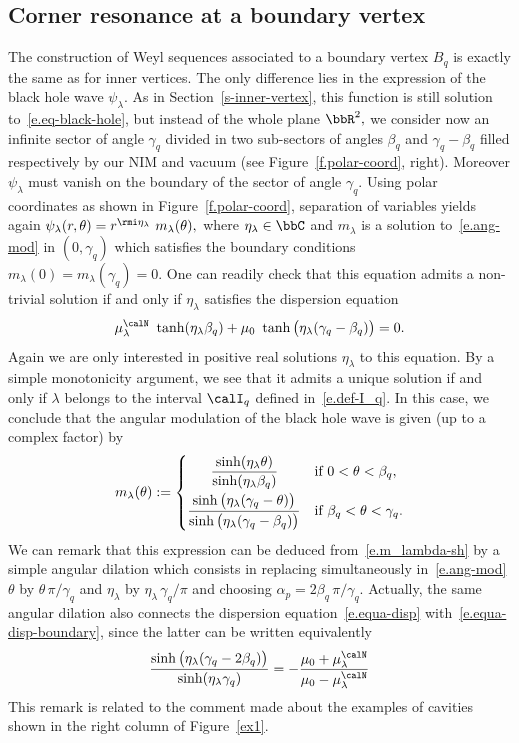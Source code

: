 \subsection{Corner resonance at a boundary vertex}\label{s-bound-vertex}
The construction of Weyl sequences associated to a boundary vertex $B_q$ is exactly the same as for inner vertices. The only difference lies in the expression of the black hole wave $\psi_\lambda.$ As in Section~\ref{s-inner-vertex}, this function is still solution to~\eqref{e.eq-black-hole}, but instead of the whole plane $\bbR^2,$ we consider now an infinite sector of angle $\gamma_q$ divided in two sub-sectors of angles $\beta_q$ and $\gamma_q - \beta_q$ filled respectively by our NIM and vacuum (see Figure~\ref{f.polar-coord}, right). Moreover $\psi_\lambda$ must vanish on the boundary of the sector of angle $\gamma_q.$ Using polar coordinates as shown in Figure~\ref{f.polar-coord}, separation of variables yields again $\psi_\lambda(r,\theta) = r^{\rmi\eta_\lambda}\ m_\lambda(\theta),$ where $\eta_\lambda \in \bbC$ and $m_\lambda$ is a solution to~\eqref{e.ang-mod} in $(0,\gamma_q)$ which satisfies the boundary conditions $m_\lambda(0) = m_\lambda(\gamma_q) = 0.$ One can readily check that this equation admits a non-trivial solution if and only if $\eta_\lambda$ satisfies the dispersion equation
\begin{equation}\label{e.equa-disp-boundary}
\mu_\lambda^\calN \ \tanh(\eta_\lambda\beta_q) + \mu_0\ \tanh\big(\eta_\lambda(\gamma_q-\beta_q)\big) = 0.
\end{equation}
Again we are only interested in positive real solutions $\eta_\lambda$ to this equation. By a simple monotonicity argument, we see that it admits a unique solution if and only if $\lambda$ belongs to the interval $\calI_q$ defined in~\eqref{e.def-I_q}. In this case, we conclude that the angular modulation of the black hole wave is given (up to a complex factor) by
\[
m_\lambda(\theta) := 
\begin{cases}
\displaystyle
\mkern 30 mu \frac{\sinh(\eta_\lambda \theta)}{\sinh(\eta_\lambda \beta_q)} & \text{if }\displaystyle 0 < \theta < \beta_q, \\[8pt]
\displaystyle
\frac{\sinh\big(\eta_\lambda (\gamma_q - \theta)\big)}{\sinh\big(\eta_\lambda (\gamma_q - \beta_q)\big)} & \text{if }\displaystyle \beta_q < \theta < \gamma_q.
\end{cases}
\]
We can remark that this expression can be deduced from~\eqref{e.m_lambda-sh} by a simple angular dilation which consists in replacing simultaneously in~\eqref{e.ang-mod} $\theta$ by $\theta\, \pi/\gamma_q$ and $\eta_\lambda$ by $\eta_\lambda\,\gamma_q/\pi$ and choosing $\alpha_p = 2 \beta_q\,\pi/\gamma_q$. Actually, the same angular dilation also connects the dispersion equation~\eqref{e.equa-disp} with~\eqref{e.equa-disp-boundary}, since the latter can be written equivalently
\[
\frac{\sinh\big(\eta_\lambda(\gamma_q-2\beta_q)\big)}{\sinh(\eta_\lambda\gamma_q)} = - \frac{\mu_0 + \mu_\lambda^\calN}{\mu_0 - \mu_\lambda^\calN}
\]
This remark is related to the comment made about the examples of cavities shown in the right column of Figure~\ref{ex1}.

